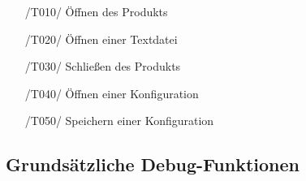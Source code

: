 \documentclass[parskip=full]{scrartcl}
\newcommand\frage[1]{\textcolor{red}{#1}}
\begin{document}
\begin{itemize}
	\item[/T010/] Öffnen des Produkts
	
	\item[/T020/] Öffnen einer Textdatei

	\item[/T030/] Schließen des Produkts
	\item[/T040/] Öffnen einer Konfiguration
	\item[/T050/] Speichern einer Konfiguration
	
	\end{itemize}

\subsection{Grundsätzliche Debug-Funktionen}
\end{document}
